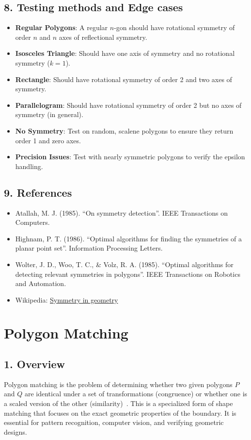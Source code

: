 \subsection{8. Testing methods and Edge cases}
\begin{itemize}
    \item \textbf{Regular Polygons}: A regular $n$-gon should have rotational symmetry of order $n$ and $n$ axes of reflectional symmetry.
    \item \textbf{Isosceles Triangle}: Should have one axis of symmetry and no rotational symmetry ($k=1$).
    \item \textbf{Rectangle}: Should have rotational symmetry of order 2 and two axes of symmetry.
    \item \textbf{Parallelogram}: Should have rotational symmetry of order 2 but no axes of symmetry (in general).
    \item \textbf{No Symmetry}: Test on random, scalene polygons to ensure they return order 1 and zero axes.
    \item \textbf{Precision Issues}: Test with nearly symmetric polygons to verify the epsilon handling.
\end{itemize}

\subsection{9. References}
\begin{itemize}
    \item Atallah, M. J. (1985). ``On symmetry detection''. IEEE Transactions on Computers.
    \item Highnam, P. T. (1986). ``Optimal algorithms for finding the symmetries of a planar point set''. Information Processing Letters.
    \item Wolter, J. D., Woo, T. C., \& Volz, R. A. (1985). ``Optimal algorithms for detecting relevant symmetries in polygons''. IEEE Transactions on Robotics and Automation.
    \item Wikipedia: \href{https://en.wikipedia.org/wiki/Symmetry_in_geometry}{Symmetry in geometry}
\end{itemize}

\section{Polygon Matching}
\label{sec:polygon_matching}

\subsection{1. Overview}
Polygon matching is the problem of determining whether two given polygons $P$ and $Q$ are identical under a set of transformations (congruence) or whether one is a scaled version of the other (similarity)~\cite{arkin1991}. This is a specialized form of shape matching that focuses on the exact geometric properties of the boundary. It is essential for pattern recognition, computer vision, and verifying geometric designs.

